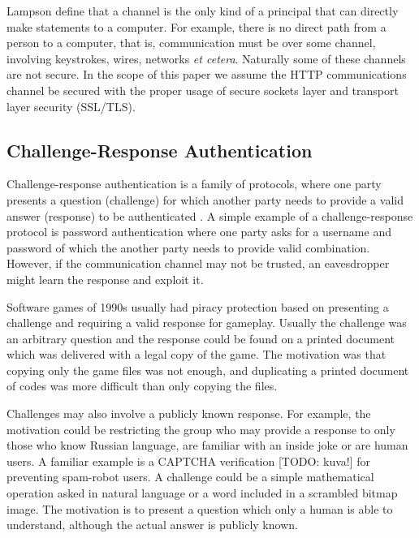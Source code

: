 \documentclass{tktltiki}
\begin{document}
          Lampson \cite{et al.} \cite{lampson_distributed_1992} define that a channel is the only kind of a principal that can directly make statements to a computer. For example, there is no direct path from a person to a computer, that is, communication must be over some channel,
involving keystrokes, wires, networks \emph{et cetera}. Naturally some of these channels are not secure. In the scope of this paper we assume
the HTTP communications channel be secured with the proper usage of secure sockets layer and transport layer security (SSL/TLS).



\subsection{Challenge-Response Authentication}

      Challenge-response authentication is a family of protocols, where one party presents a question (challenge) for which another party needs to provide a valid answer (response) to be authenticated \cite{wikipedia:Challenge-response_authentication}. A simple example of a challenge-response protocol is password authentication where one party asks for a username and password of which the another party needs to provide valid combination. However, if the communication channel may not be trusted, an eavesdropper might learn the response and exploit it.

      Software games of 1990s usually had piracy protection based on presenting a challenge and requiring a valid response for gameplay. Usually the challenge was an arbitrary question and the response could be found on a printed document which was delivered with a legal copy of the game. The motivation was that copying only the game files was not enough, and duplicating a printed document of codes was more difficult than only copying the files.

      Challenges may also involve a publicly known response. For example, the motivation could be restricting the group who may provide a response to only those who know Russian language, are familiar with an inside joke or are human users. A familiar example is a CAPTCHA verification [TODO: kuva!] for preventing spam-robot users. A challenge could be a simple mathematical operation asked in natural language or a word included in a scrambled bitmap image. The motivation is to present a question which only a human is able to understand, although the actual answer is publicly known.
\end{document}
